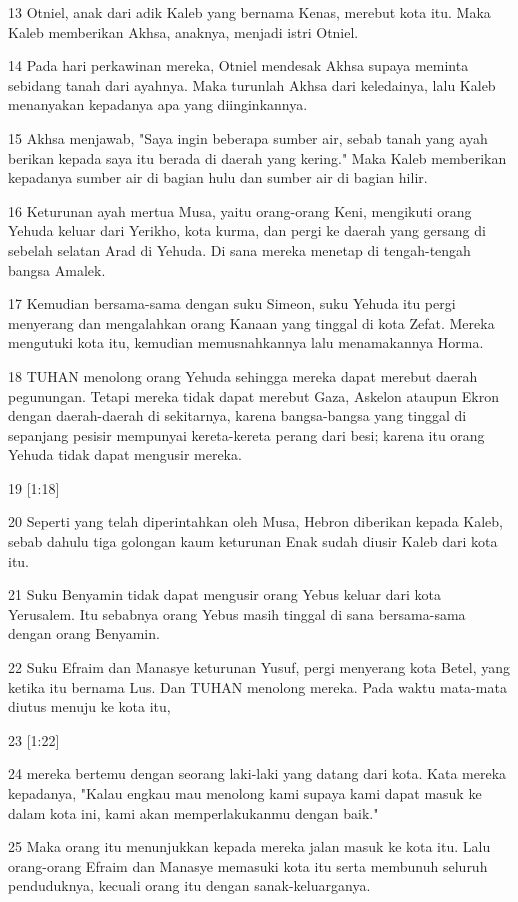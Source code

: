 \par 13 Otniel, anak dari adik Kaleb yang bernama Kenas, merebut kota itu. Maka Kaleb memberikan Akhsa, anaknya, menjadi istri Otniel.
\par 14 Pada hari perkawinan mereka, Otniel mendesak Akhsa supaya meminta sebidang tanah dari ayahnya. Maka turunlah Akhsa dari keledainya, lalu Kaleb menanyakan kepadanya apa yang diinginkannya.
\par 15 Akhsa menjawab, "Saya ingin beberapa sumber air, sebab tanah yang ayah berikan kepada saya itu berada di daerah yang kering." Maka Kaleb memberikan kepadanya sumber air di bagian hulu dan sumber air di bagian hilir.
\par 16 Keturunan ayah mertua Musa, yaitu orang-orang Keni, mengikuti orang Yehuda keluar dari Yerikho, kota kurma, dan pergi ke daerah yang gersang di sebelah selatan Arad di Yehuda. Di sana mereka menetap di tengah-tengah bangsa Amalek.
\par 17 Kemudian bersama-sama dengan suku Simeon, suku Yehuda itu pergi menyerang dan mengalahkan orang Kanaan yang tinggal di kota Zefat. Mereka mengutuki kota itu, kemudian memusnahkannya lalu menamakannya Horma.
\par 18 TUHAN menolong orang Yehuda sehingga mereka dapat merebut daerah pegunungan. Tetapi mereka tidak dapat merebut Gaza, Askelon ataupun Ekron dengan daerah-daerah di sekitarnya, karena bangsa-bangsa yang tinggal di sepanjang pesisir mempunyai kereta-kereta perang dari besi; karena itu orang Yehuda tidak dapat mengusir mereka.
\par 19 [1:18]
\par 20 Seperti yang telah diperintahkan oleh Musa, Hebron diberikan kepada Kaleb, sebab dahulu tiga golongan kaum keturunan Enak sudah diusir Kaleb dari kota itu.
\par 21 Suku Benyamin tidak dapat mengusir orang Yebus keluar dari kota Yerusalem. Itu sebabnya orang Yebus masih tinggal di sana bersama-sama dengan orang Benyamin.
\par 22 Suku Efraim dan Manasye keturunan Yusuf, pergi menyerang kota Betel, yang ketika itu bernama Lus. Dan TUHAN menolong mereka. Pada waktu mata-mata diutus menuju ke kota itu,
\par 23 [1:22]
\par 24 mereka bertemu dengan seorang laki-laki yang datang dari kota. Kata mereka kepadanya, "Kalau engkau mau menolong kami supaya kami dapat masuk ke dalam kota ini, kami akan memperlakukanmu dengan baik."
\par 25 Maka orang itu menunjukkan kepada mereka jalan masuk ke kota itu. Lalu orang-orang Efraim dan Manasye memasuki kota itu serta membunuh seluruh penduduknya, kecuali orang itu dengan sanak-keluarganya.
